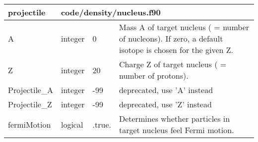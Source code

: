 \documentclass{article}
\begin{document}
\begin{longtable}{llll}
\toprule
\textbf{\large{projectile}} & \multicolumn{3}{l}{\footnotesize{code/density/nucleus.f90}}\\*
\midrule
\endfirsthead
\midrule
\endhead
A & \begin{minipage}[t]{2cm}integer\end{minipage} & \begin{minipage}[t]{2cm}0\end{minipage} & \begin{minipage}[t]{12cm}Mass A of target nucleus ( = number of nucleons). If zero, a default isotope is chosen for the given Z.\end{minipage}\\*
\midrule
Z & \begin{minipage}[t]{2cm}integer\end{minipage} & \begin{minipage}[t]{2cm}20\end{minipage} & \begin{minipage}[t]{12cm}Charge Z of target nucleus ( = number of protons).\end{minipage}\\*
\midrule
Projectile\_A & \begin{minipage}[t]{2cm}integer\end{minipage} & \begin{minipage}[t]{2cm}-99\end{minipage} & \begin{minipage}[t]{12cm}deprecated, use 'A' instead\end{minipage}\\*
\midrule
Projectile\_Z & \begin{minipage}[t]{2cm}integer\end{minipage} & \begin{minipage}[t]{2cm}-99\end{minipage} & \begin{minipage}[t]{12cm}deprecated, use 'Z' instead\end{minipage}\\*
\midrule
fermiMotion & \begin{minipage}[t]{2cm}logical\end{minipage} & \begin{minipage}[t]{2cm}.true.\end{minipage} & \begin{minipage}[t]{12cm}Determines whether particles in target nucleus feel Fermi motion.\end{minipage}\\*

\end{longtable}
\end{document}
